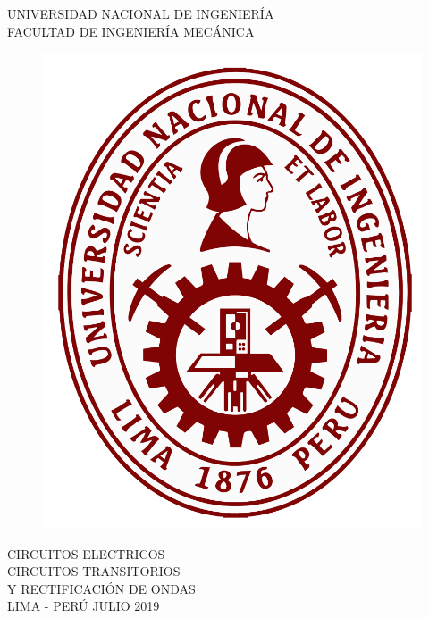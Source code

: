 \documentclass[a4paper,12pt]{report}
\begin{document}
\setcounter{page}{1}
\thispagestyle{empty}
\begin{center}
{\huge UNIVERSIDAD NACIONAL DE INGENIERÍA}\\[0.9cm]
{\Large FACULTAD DE INGENIERÍA MECÁNICA}\\[0.6in]
\end{center}
\begin{figure}[h]
\begin{center}
\includegraphics[scale=0.33]{logoUNI.png}
\end{center}
\end{figure}
\vspace{0.4cm}
\begin{center}
CIRCUITOS ELECTRICOS\\[14mm]
{\Large CIRCUITOS TRANSITORIOS\\ Y RECTIFICACIÓN DE ONDAS}\\[10mm]
\vfill
LIMA - PERÚ \hfill JULIO 2019
\end{center}
\end{document}
